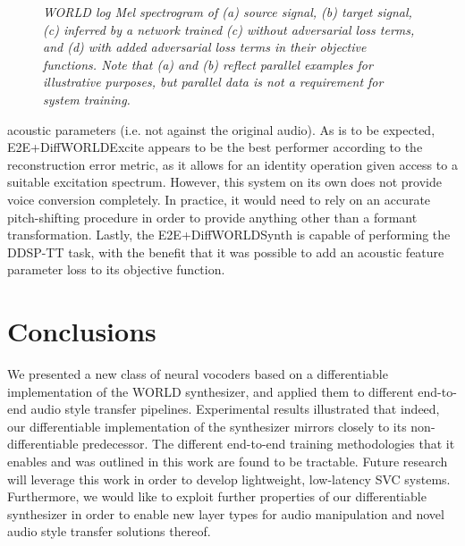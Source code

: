 \documentclass{article}
\begin{document}
\begin{sloppy}
\begin{figure}[ht]
\caption{\it WORLD log Mel spectrogram of (a) source signal, (b) target signal, (c) inferred by a network trained (c) without adversarial loss terms, and (d) with added adversarial loss terms in their objective functions.  Note that (a) and (b) reflect parallel examples for illustrative purposes, but parallel data is not a requirement for system training.}
\label{fig:mle_gan}
\end{figure}
acoustic parameters (i.e. not against the original audio).  As is to be expected, E2E+DiffWORLDExcite appears to be the best performer according to the reconstruction error metric, as it allows for an identity operation given access to a suitable excitation spectrum.  However, this system on its own does not provide voice conversion completely.  In practice, it would need to rely on an accurate pitch-shifting procedure in order to provide anything other than a formant transformation.  Lastly, the E2E+DiffWORLDSynth is capable of performing the DDSP-TT task, with the benefit that it was possible to add an acoustic feature parameter loss to its objective function.




\section{Conclusions}
\label{sec:conclusions}

We presented a new class of neural vocoders based on a differentiable implementation of the WORLD synthesizer, and applied them to different end-to-end audio style transfer pipelines.  Experimental results illustrated that indeed, our differentiable implementation of the synthesizer mirrors closely to its non-differentiable predecessor.  The different end-to-end training methodologies that it enables and was outlined in this work are found to be tractable.  Future research will leverage this work in order to develop lightweight, low-latency SVC systems. Furthermore, we would like to exploit further properties of our differentiable synthesizer in order to enable new layer types for audio manipulation and novel audio style transfer solutions thereof.




\end{sloppy}
\end{document}
